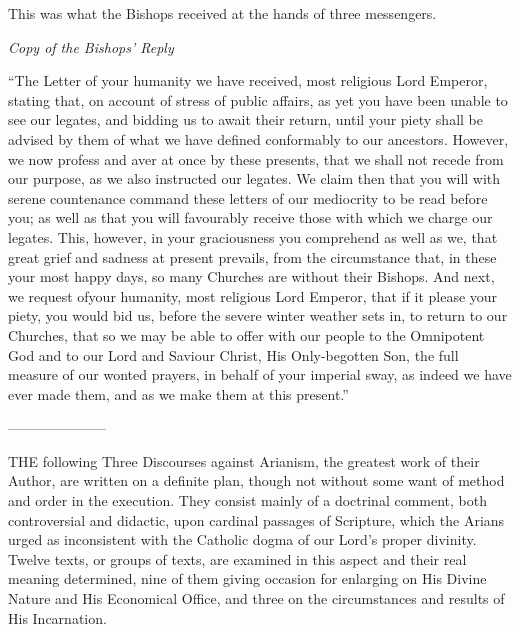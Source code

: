 This was what the Bishops
received at the hands of three messengers.

\emph{Copy
of the Bishops' Reply}

``The Letter of your humanity
we have received, most religious Lord Emperor, stating that, on
account of stress of public affairs, as yet you have been unable to
see our legates, and bidding us to await their return, until your
piety shall be advised by them of what we have defined conformably to
our ancestors. However, we now profess and aver at once by these
presents, that we shall not recede from our purpose, as we also
instructed our legates. We claim then that you will with serene
countenance command these letters of our mediocrity to be read before
you; as well as that you will favourably receive those with which we
charge our legates. This, however, in your graciousness you comprehend
as well as we, that great grief and sadness at present prevails, from
the circumstance that, in these your most happy days, so many Churches
are without their Bishops. And next, we request of\emph{}your
humanity, most religious Lord Emperor, that if it please your
piety, you would bid us, before the severe winter weather sets in, to
return to our Churches, that so we may be able to offer with our
people to the Omnipotent God and to our Lord and Saviour Christ, His
Only-begotten Son, the full measure of our wonted prayers, in behalf
of your imperial sway, as indeed we have ever made them, and as we
make them at this present.''


———————


THE
following Three Discourses against Arianism, the greatest work of
their Author, are written on a definite plan, though not without some
want of method and order in the execution. They consist mainly of a
doctrinal comment, both controversial and didactic, upon cardinal
passages of Scripture, which the Arians urged as inconsistent with the
Catholic dogma of our Lord's proper divinity. Twelve texts, or groups
of texts, are examined in this aspect and their real meaning
determined, nine of them giving occasion for enlarging on His Divine
Nature and His Economical Office, and three on the circumstances and
results of His Incarnation.

